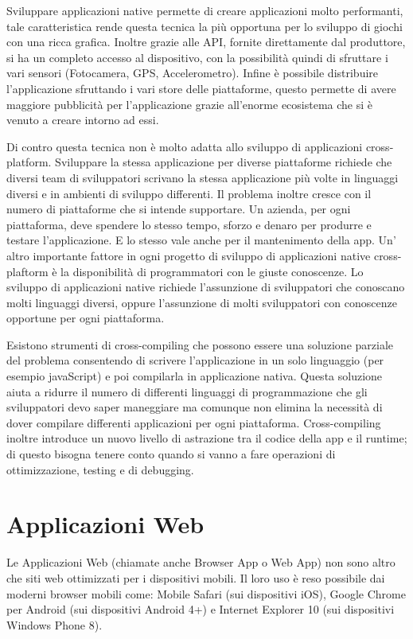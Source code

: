 Sviluppare applicazioni native permette di creare applicazioni molto performanti, tale caratteristica rende questa tecnica la più opportuna per lo sviluppo di giochi con una ricca grafica. Inoltre grazie alle API, fornite direttamente dal produttore, si ha un completo accesso al dispositivo, con la possibilità quindi di sfruttare i vari sensori (Fotocamera, GPS, Accelerometro). Infine è possibile distribuire l'applicazione sfruttando i vari store delle piattaforme, questo permette di avere maggiore pubblicità per l'applicazione grazie all'enorme ecosistema che si è venuto a creare intorno ad essi.

Di contro questa tecnica non è molto adatta allo sviluppo di applicazioni cross-platform. Sviluppare la stessa applicazione per diverse piattaforme richiede che diversi team di sviluppatori scrivano la stessa applicazione più volte in linguaggi diversi e in ambienti di sviluppo differenti.
Il problema inoltre cresce con il numero di piattaforme che si intende supportare. Un azienda, per ogni piattaforma, deve spendere lo stesso tempo, sforzo e denaro per produrre e testare l'applicazione. E lo stesso vale anche per il mantenimento della app.
Un' altro importante fattore in ogni progetto di sviluppo di applicazioni native cross-plaftorm è la disponibilità di programmatori con le giuste conoscenze. Lo sviluppo di applicazioni native richiede l'assunzione di sviluppatori che conoscano molti linguaggi diversi, oppure l'assunzione di molti sviluppatori con conoscenze opportune per ogni piattaforma.
 
Esistono strumenti di cross-compiling che possono essere una soluzione parziale del problema consentendo di scrivere l'applicazione in un solo linguaggio (per esempio javaScript) e poi compilarla in applicazione nativa. Questa soluzione aiuta a ridurre il numero di differenti linguaggi di programmazione che gli sviluppatori devo saper maneggiare ma comunque non elimina la necessità di dover compilare differenti applicazioni per ogni piattaforma. Cross-compiling inoltre introduce un nuovo livello di astrazione tra il codice della app e il runtime; di questo bisogna tenere conto quando si vanno a fare operazioni di ottimizzazione, testing e di debugging.

	\section{Applicazioni Web}
		Le Applicazioni Web (chiamate anche Browser App o Web App) non sono altro che siti web ottimizzati per i dispositivi mobili. Il loro uso è reso possibile dai moderni browser mobili come: Mobile Safari (sui dispositivi iOS), Google Chrome per Android (sui dispositivi Android 4+) e Internet Explorer 10 (sui dispositivi Windows Phone 8).
		
